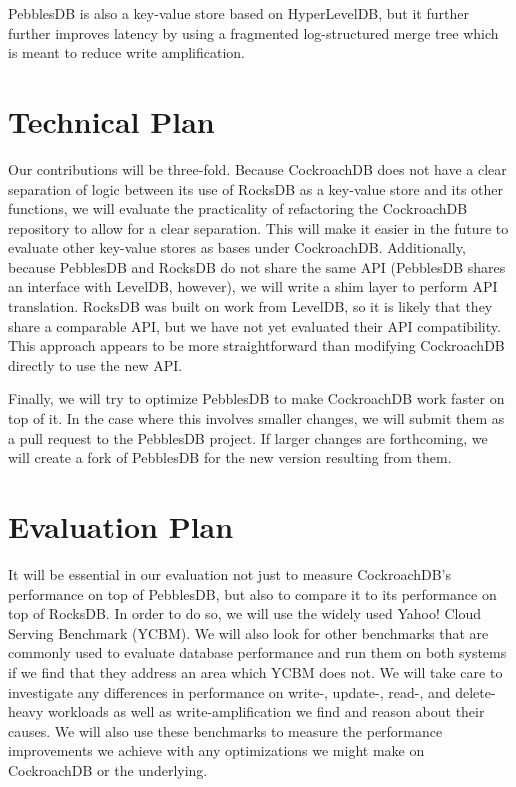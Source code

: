 \documentclass[10pt,twocolumn,letterpaper]{article}
\begin{document}
PebblesDB is also a key-value store based on HyperLevelDB, but it further
further improves latency by using a fragmented log-structured merge tree which
is meant to reduce write amplification.


\section{Technical Plan}
Our contributions will be three-fold. Because CockroachDB does not have a clear
separation of logic between its use of RocksDB as a key-value store and its
other functions, we will evaluate the practicality of refactoring the
CockroachDB repository to allow for a clear separation. This will make it
easier in the future to evaluate other key-value stores as bases under
CockroachDB. Additionally, because PebblesDB and RocksDB do not share the same
API (PebblesDB shares an interface with LevelDB, however), we will write a shim
layer to perform API translation. RocksDB was built on work from LevelDB, so it
is likely that they share a comparable API, but we have not yet evaluated their
API compatibility. This approach appears to be more straightforward than
modifying CockroachDB directly to use the new API.

Finally, we will try to optimize PebblesDB to make CockroachDB work faster on
top of it. In the case where this involves smaller changes, we will submit them
as a pull request to the PebblesDB project. If larger changes are forthcoming,
we will create a fork of PebblesDB for the new version resulting from them.


\section{Evaluation Plan}
It will be essential in our evaluation not just to measure CockroachDB's
performance on top of PebblesDB, but also to compare it to its performance on
top of RocksDB. In order to do so, we will use the widely used Yahoo! Cloud
Serving Benchmark (YCBM). We will also look for other benchmarks that are
commonly used to evaluate database performance and run them on both systems if
we find that they address an area which YCBM does not. We will take care to
investigate any differences in performance on write-, update-, read-, and
delete-heavy workloads as well as write-amplification we find and reason about
their causes. We will also use these benchmarks to measure the performance
improvements we achieve with any optimizations we might make on CockroachDB or
the underlying.
\end{document}
